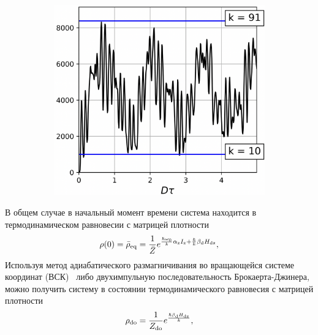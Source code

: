 \begin{figure}[H]
\begin{subfigure}[t]{0.3\textwidth}
    \caption{\protect}
    \label{fig:result-nanopore-do-m2-by-time-n101-beta2}
  \end{subfigure}
  \hfill
  \begin{subfigure}[t]{0.3\textwidth}
    \centering
    \includegraphics[width=\textwidth]{figures/result-nanopore-do-m2-by-time-n101-beta3.png}
    \caption{\protect}
    \label{fig:result-nanopore-do-m2-by-time-n101-beta3}
  \end{subfigure}
  \caption{\protect}
  \label{fig:result-nanopore-do-m2-by-time-n101-betas}
\end{figure}

В общем случае в начальный момент времени система находится в термодинамическом равновесии с матрицей плотности
%
\begin{equation}\label{eq:rho-eq-hdz}
  \rho(0) = \bar\rho_\mathrm{eq} = \dfrac{1}{\bar Z} e^{ \frac{\hslash \omega_{0}}{k} \alpha_\mathrm{z} I_\mathrm{z} + \frac{\hslash }{k} \beta_\mathrm{d} H_\mathrm{dz} },
\end{equation}
\rhoEqHdzExplanatoryNote
%
Используя  метод адиабатического размагничивания во вращающейся системе координат (ВСК)~\cite{Goldman1970, Slichter1961}
либо двухимпульную последовательность Брокаерта-Джинера,
можно получить систему в состоянии термодинамического равновесия с матрицей плотности
%
\begin{equation}\label{eq:do-state}
 \rho_\mathrm{do} = \frac{1}{Z_\mathrm{do}} e^\frac{\hslash\beta_\mathrm{d} H_\mathrm{dz}}{k},
\end{equation}
\rhoDoExplanatoryNote

